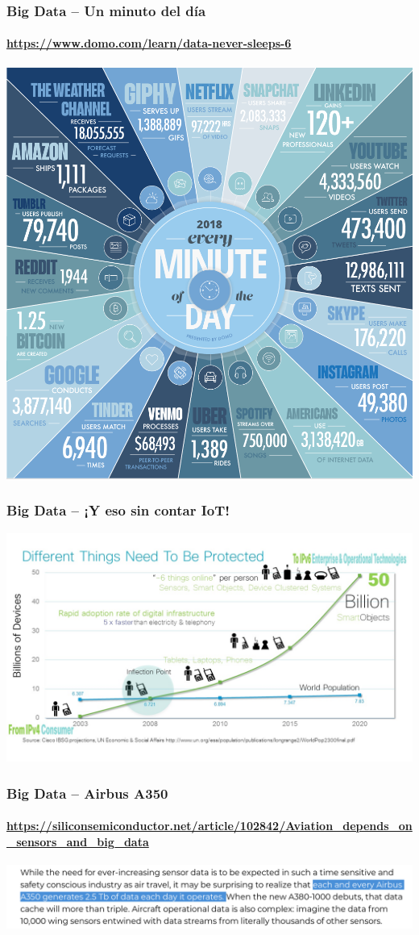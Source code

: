 \documentclass[14pt]{beamer}
\begin{document}
\begin{frame}
  \frametitle{Big Data -- Un minuto del día}
  \framesubtitle{\url{https://www.domo.com/learn/data-never-sleeps-6}}
  \centering\includegraphics[height=.8\textheight]{img/data-never-sleeps-6-2}
\end{frame}

\begin{frame}
  \frametitle{Big Data -- ¡Y eso sin contar IoT!}
  \centering\includegraphics[width=\textwidth]{img/iot}
\end{frame}

\begin{frame}
  \frametitle{Big Data -- Airbus A350}
  \framesubtitle{\url{https://siliconsemiconductor.net/article/102842/Aviation_depends_on_sensors_and_big_data}}
  \centering\includegraphics[width=\textwidth]{img/a350}
\end{frame}
\end{document}

